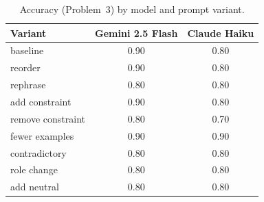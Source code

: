 \begin{table}[h]
  \centering
  \begin{tabular}{lcc}
    \toprule
    Variant & Gemini 2.5 Flash & Claude Haiku \\
    \midrule
    baseline & 0.90 & 0.80 \\
    reorder & 0.90 & 0.80 \\
    rephrase & 0.80 & 0.80 \\
    add constraint & 0.90 & 0.80 \\
    remove constraint & 0.80 & 0.70 \\
    fewer examples & 0.90 & 0.90 \\
    contradictory & 0.80 & 0.80 \\
    role change & 0.80 & 0.80 \\
    add neutral & 0.80 & 0.80 \\
    \bottomrule
  \end{tabular}
  \caption{Accuracy (Problem~3) by model and prompt variant.}
  \label{tab:sensitivity}
\end{table}
